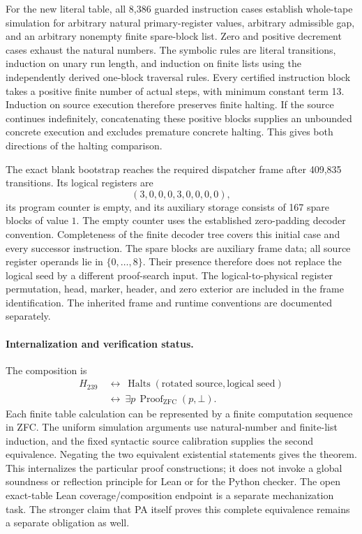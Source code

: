 For the new literal table, all 8,386 guarded instruction cases establish
whole-tape simulation for arbitrary natural primary-register values,
arbitrary admissible gap, and an arbitrary nonempty finite spare-block list. Zero
and positive decrement cases exhaust the natural numbers. The symbolic
rules are literal transitions, induction on unary run length, and induction
on finite lists using the independently derived one-block traversal rules.
Every certified instruction block takes a positive finite number of actual
steps, with minimum constant term 13. Induction on source execution therefore
preserves finite halting. If the source continues indefinitely, concatenating
these positive blocks supplies an unbounded concrete execution and excludes
premature concrete halting. This gives both directions of the halting
comparison.

The exact blank bootstrap reaches the required dispatcher frame after
409,835 transitions. Its logical registers are
\[
 (3,0,0,0,3,0,0,0,0),
\]
its program counter is empty, and its auxiliary storage consists of 167
spare blocks of value $1$. The empty counter uses the established zero-padding
decoder convention. Completeness of the finite decoder tree covers this
initial case and every successor instruction. The spare blocks are auxiliary
frame data; all source register operands lie in $\{0,\ldots,8\}$. Their
presence therefore does not replace the logical seed by a different
proof-search input. The logical-to-physical register permutation, head,
marker, header, and zero exterior are included in the frame identification.
The inherited frame and runtime conventions are documented separately.
\cite{tree240,runtime240}

\paragraph{Internalization and verification status.}
The composition is
\[
 \begin{aligned}
 H_{239}&\ \longleftrightarrow\
 \operatorname{Halts}(\text{rotated source},\text{logical seed})\\
 &\ \longleftrightarrow\
 \exists p\,\operatorname{Proof}_{\mathrm{ZFC}}(p,\bot).
 \end{aligned}
\]
Each finite table calculation can be represented by a finite computation
sequence in ZFC. The uniform simulation arguments use natural-number and
finite-list induction, and the fixed syntactic source calibration supplies
the second equivalence. Negating the two equivalent existential statements
gives the theorem. This internalizes the particular proof constructions;
it does not invoke a global soundness or reflection principle for Lean or
for the Python checker. The open exact-table Lean coverage/composition
endpoint is a separate mechanization task. The stronger claim that PA itself
proves this complete equivalence remains a separate obligation as well.

